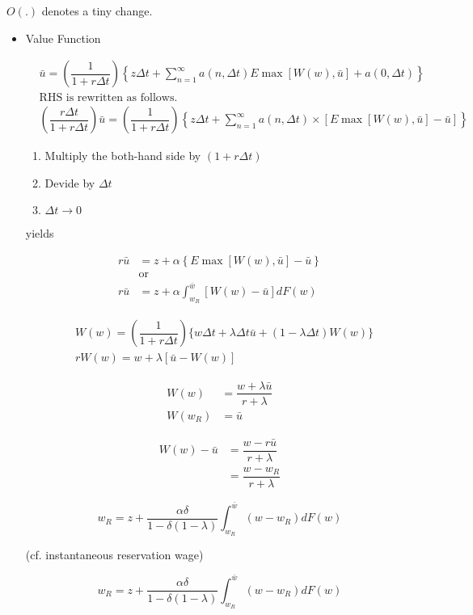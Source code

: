\documentclass[dvipdfmx, 12pt]{article}
\begin{document}
$O(.)$ denotes a tiny change.

\begin{itemize}
  \item Value Function

  \begin{align*}
    &\bar{u} = \left( \dfrac{1}{1 + r \Delta t} \right) \left \{ z \Delta t + \sum_{n = 1}^{\infty} a(n, \Delta t) E \max[W(w), \bar{u}] + a(0, \Delta t) \right \} \\
    & \text{RHS is rewritten as follows.} \\
    & \left( \dfrac{r \Delta t}{1 + r \Delta t} \right) \bar{u} = \left( \dfrac{1}{1 + r \Delta t} \right) \left \{ z \Delta t + \sum_{n = 1}^{\infty} a (n, \Delta t) \times [E \max [W(w), \bar{u}] - \bar{u}] \right\}
  \end{align*}

  \begin{enumerate}
    \item Multiply the both-hand side by $(1 + r \Delta t)$

    \item Devide by $\Delta t$

    \item $\Delta t \to 0$
  \end{enumerate}

  yields

  \begin{align*}
    r \bar{u} &= z + \alpha \left \{ E \max[W(w), \bar{u}] - \bar{u} \right \} \\
    & \text{or} \\
    r \bar{u} &= z + \alpha \int_{w_R}^{\bar{w}} [W(w)- \bar{u}] dF(w)
  \end{align*}

  \begin{align*}
    & W(w) = \left( \dfrac{1}{1 + r \Delta t} \right ) \{ w \Delta t + \lambda \Delta t \bar{u} + (1 - \lambda \Delta t)W(w) \} \\
    & r W(w) = w + \lambda [\bar{u} - W(w)]
  \end{align*}

  \begin{align*}
    W(w) &= \dfrac{w + \lambda \bar{u}}{r + \lambda} \\
    W(w_R) &= \bar{u}
  \end{align*}

  \begin{align*}
    W(w) - \bar{u} &= \dfrac{w - r \bar{u}}{r + \lambda} \\
    & = \dfrac{w - w_R}{r + \lambda}
  \end{align*}

  \[
  w_R = z + \dfrac{\alpha \delta}{1 - \delta (1 -\lambda)} \int_{w_R}^{\bar{w}} (w - w_R) dF(w)
  \]

  (cf. instantaneous reservation wage)

  \[
  w_R  = z + \dfrac{\alpha \delta}{1 - \delta(1- \lambda)} \int_{w_R}^{\bar{w}} (w - w_R) dF(w)
  \]

\end{itemize}
\end{document}
